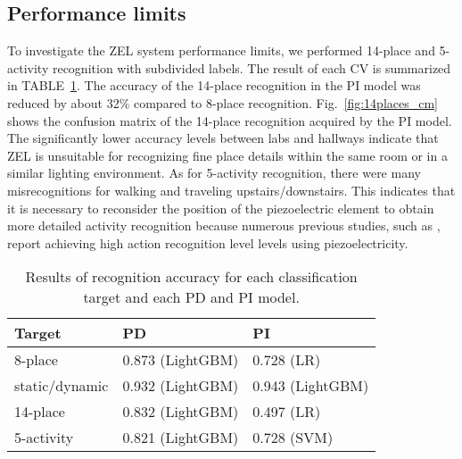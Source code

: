 \documentclass[conference]{IEEEtran}
\begin{document}
\subsection{Performance limits}
To investigate the ZEL system performance limits, we performed 14-place and 5-activity recognition with subdivided labels.
The result of each CV is summarized in TABLE~\ref{tab:cv_for_each_target}.
The accuracy of the 14-place recognition in the PI model was reduced by about 32\% compared to 8-place recognition.
Fig.~\ref{fig:14places_cm} shows the confusion matrix of the 14-place recognition acquired by the PI model.
The significantly lower accuracy levels between labs and hallways indicate that ZEL is unsuitable for recognizing fine place details within the same room or in a similar lighting environment.
As for 5-activity recognition, there were many misrecognitions for walking and traveling upstairs/downstairs.
This indicates that it is necessary to reconsider the position of the piezoelectric element to obtain more detailed activity recognition because numerous previous studies, such as \cite{ma2018sehs}, report achieving high action recognition level levels using piezoelectricity.

\begin{table}[bt]
 \centering
 \caption{Results of recognition accuracy for each classification target and each PD and PI model.}
 \label{tab:cv_for_each_target}
 \begin{tabular}{lll} \hline
 Target & PD & PI \\ \hline \hline
 8-place & 0.873 (LightGBM) & 0.728 (LR) \\
 static/dynamic & 0.932 (LightGBM) & 0.943 (LightGBM) \\
 14-place & 0.832 (LightGBM) & 0.497 (LR) \\
 5-activity & 0.821 (LightGBM) & 0.728 (SVM) \\
 \hline
 \end{tabular}
\end{table}
\end{document}
